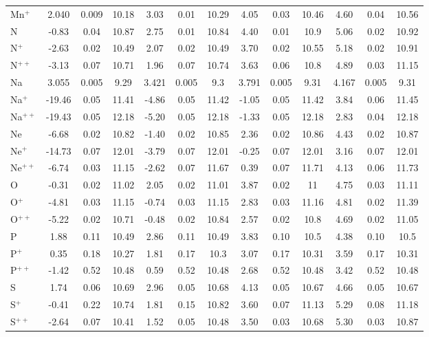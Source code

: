 \begin{longtable}{l!{\vrule width 0.25pt}ccc!{\vrule width 0.25pt}ccc!{\vrule width 0.25pt}ccc!{\vrule width 0.25pt}ccc}
Mn$^+$ & 2.040 & 0.009 & 10.18 & 3.03 & 0.01 & 10.29 & 4.05 & 0.03 & 10.46 & 4.60 & 0.04 & 10.56 \\
N & -0.83 & 0.04 & 10.87 & 2.75 & 0.01 & 10.84 & 4.40 & 0.01 & 10.9 & 5.06 & 0.02 & 10.92 \\
N$^+$ & -2.63 & 0.02 & 10.49 & 2.07 & 0.02 & 10.49 & 3.70 & 0.02 & 10.55 & 5.18 & 0.02 & 10.91 \\
N$^{++}$ & -3.13 & 0.07 & 10.71 & 1.96 & 0.07 & 10.74 & 3.63 & 0.06 & 10.8 & 4.89 & 0.03 & 11.15 \\
Na & 3.055 & 0.005 & 9.29 & 3.421 & 0.005 & 9.3 & 3.791 & 0.005 & 9.31 & 4.167 & 0.005 & 9.31 \\
Na$^+$ & -19.46 & 0.05 & 11.41 & -4.86 & 0.05 & 11.42 & -1.05 & 0.05 & 11.42 & 3.84 & 0.06 & 11.45 \\
Na$^{++}$ & -19.43 & 0.05 & 12.18 & -5.20 & 0.05 & 12.18 & -1.33 & 0.05 & 12.18 & 2.83 & 0.04 & 12.18 \\
Ne & -6.68 & 0.02 & 10.82 & -1.40 & 0.02 & 10.85 & 2.36 & 0.02 & 10.86 & 4.43 & 0.02 & 10.87 \\
Ne$^+$ & -14.73 & 0.07 & 12.01 & -3.79 & 0.07 & 12.01 & -0.25 & 0.07 & 12.01 & 3.16 & 0.07 & 12.01 \\
Ne$^{++}$ & -6.74 & 0.03 & 11.15 & -2.62 & 0.07 & 11.67 & 0.39 & 0.07 & 11.71 & 4.13 & 0.06 & 11.73 \\
O & -0.31 & 0.02 & 11.02 & 2.05 & 0.02 & 11.01 & 3.87 & 0.02 & 11 & 4.75 & 0.03 & 11.11 \\
O$^+$ & -4.81 & 0.03 & 11.15 & -0.74 & 0.03 & 11.15 & 2.83 & 0.03 & 11.16 & 4.81 & 0.02 & 11.39 \\
O$^{++}$ & -5.22 & 0.02 & 10.71 & -0.48 & 0.02 & 10.84 & 2.57 & 0.02 & 10.8 & 4.69 & 0.02 & 11.05 \\
P & 1.88 & 0.11 & 10.49 & 2.86 & 0.11 & 10.49 & 3.83 & 0.10 & 10.5 & 4.38 & 0.10 & 10.5 \\
P$^+$ & 0.35 & 0.18 & 10.27 & 1.81 & 0.17 & 10.3 & 3.07 & 0.17 & 10.31 & 3.59 & 0.17 & 10.31 \\
P$^{++}$ & -1.42 & 0.52 & 10.48 & 0.59 & 0.52 & 10.48 & 2.68 & 0.52 & 10.48 & 3.42 & 0.52 & 10.48 \\
S & 1.74 & 0.06 & 10.69 & 2.96 & 0.05 & 10.68 & 4.13 & 0.05 & 10.67 & 4.66 & 0.05 & 10.67 \\
S$^+$ & -0.41 & 0.22 & 10.74 & 1.81 & 0.15 & 10.82 & 3.60 & 0.07 & 11.13 & 5.29 & 0.08 & 11.18 \\
S$^{++}$ & -2.64 & 0.07 & 10.41 & 1.52 & 0.05 & 10.48 & 3.50 & 0.03 & 10.68 & 5.30 & 0.03 & 10.87 \\

\end{longtable}
